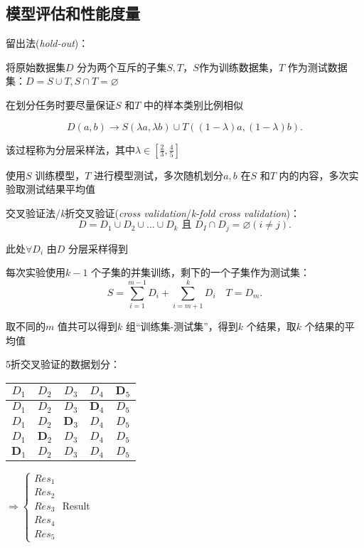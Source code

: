 \subsection{模型评估和性能度量}%
\label{sub:模型评估和性能度量}
\begin{notation}
    留出法(\textit{hold-out})：

    将原始数据集$D$ 分为两个互斥的子集$S,T$，$S$作为训练数据集，$T$ 作为测试数据集：$D=S\cup T,S\cap T=\varnothing $
\end{notation}
在划分任务时要尽量保证$S$ 和$T$ 中的样本类别比例相似
\begin{eg}
    \[
        D\left( a,b \right)  \to S\left( \lambda a,\lambda b \right) \cup T\left( \left( 1-\lambda \right) a,\left( 1-\lambda \right) b \right)
    .\] 

    该过程称为分层采样法，其中$\lambda\in [\frac{2}{3} , \frac{4}{5} ]$

    使用$S$ 训练模型，$T$ 进行模型测试，多次随机划分$a,b$ 在$S$ 和$T$ 内的内容，多次实验取测试结果平均值
\end{eg}
\begin{notation}
    交叉验证法/\textit{k}折交叉验证(\textit{cross validation}/\textit{k-fold cross validation})：\[
        D=D_1\cup D_2\cup \ldots\cup D_k\text{ 且 }D_I\cap D_j=\varnothing \left( i\neq j \right)
    .\]   

    此处$\forall D_i$ 由$D$ 分层采样得到

    每次实验使用$k-1$ 个子集的并集训练，剩下的一个子集作为测试集：\[
        S=\sum_{i=1}^{m-1} D_i + \sum_{i=m+1}^{k}D_i\quad T=D_m
    .\] 

    取不同的$m$ 值共可以得到$k$ 组“训练集-测试集”，得到$k$ 个结果，取$k$ 个结果的平均值
\end{notation}
\begin{eg}
    5折交叉验证的数据划分：
    \begin{table}[htpb]
        \centering
        \begin{tabular}{|c|c|c|c|c|}
        \hline
        $D_1$ & $D_2$ & $D_3$ & $D_4$ & $\bm{D}_5$ \\
        \hline
        $D_1$ & $D_2$ & $D_3$ & $\bm{D}_4$ & $D_5$ \\
        \hline
        $D_1$ & $D_2$ & $\bm{D}_3$ & $D_4$ & $D_5$ \\
        \hline
        $D_1$ & $\bm{D}_2$ & $D_3$ & $D_4$ & $D_5$ \\
        \hline
        $\bm{D}_1$ & $D_2$ & $D_3$ & $D_4$ & $D_5$ \\
        \hline
        \end{tabular}
        $\Rightarrow \begin{cases}
            Res_1\\
            Res_2\\
            Res_3\\
            Res_4\\
            Res_5
        \end{cases}$
        \ce{->[Avg.]}Result
    \end{table}
\end{eg}
